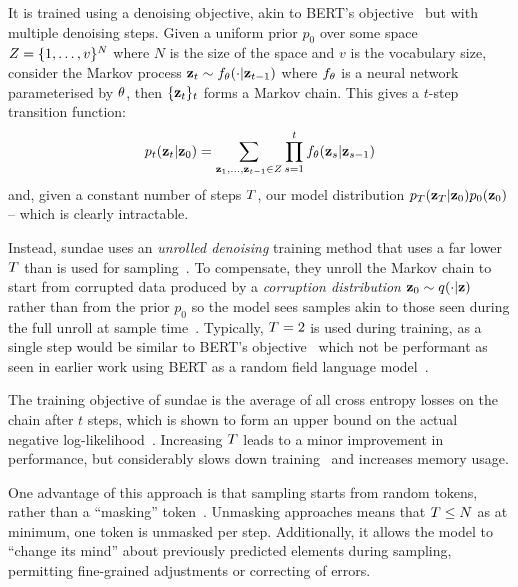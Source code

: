 It is trained using a denoising objective, akin to 
BERT's objective~\cite{wang2019bert} but with multiple denoising steps.
Given a uniform prior $p_0$ over some space $Z = \{1, \dots,
v\}^N$ where $N$ is the size of the space and $v$ is the
vocabulary size, consider the Markov process $\mathbf{z}_t \sim f_\theta(\cdot \vert
\mathbf{z}_{t-1})$ where $f_\theta$ is a neural network parameterised by
$\theta$, then $\{\mathbf{z}_t\}_t$ forms a Markov chain. This gives a
$t$-step transition function: 
\begin{equation}\label{eq:markov} p_t(\mathbf{z}_t
    \vert \mathbf{z}_0) = \sum\limits_{\mathbf{z}_1, \dots, \mathbf{z}_{t-1} \in
    Z} \prod\limits^t_{s=1} f_\theta(\mathbf{z}_s | \mathbf{z}_{s-1})
\end{equation}
\cite{savinov2022stepunrolled} and, given a constant number of steps
$T$, our model distribution $p_T(\mathbf{z}_T
\vert \mathbf{z}_0)p_0(\mathbf{z}_0)$ -- which is clearly intractable.

Instead, \gls{sundae} uses an \textit{unrolled denoising} training method that
uses a far lower $T$ than is used for
sampling~\cite{savinov2022stepunrolled}. To compensate, they unroll the Markov
chain to start from corrupted data produced by a \textit{corruption
distribution} $\mathbf{z}_0 \sim q(\cdot \vert \mathbf{z})$
rather than from the prior $p_0$ so the model sees samples akin to those seen
during the full unroll at sample time~\cite{savinov2022stepunrolled}. Typically,
$T = 2$ is used during training, as a single step would be similar to
BERT's objective~\cite{devlin2019bert} which not be performant as seen in
earlier work using BERT as a random field language model~\cite{wang2019bert}.

The training objective of \gls{sundae} is the average of all
cross entropy losses on the chain after $t$ steps, which is shown to form an
upper bound on the actual negative
log-likelihood~\cite{savinov2022stepunrolled}. Increasing $T$
leads to a minor improvement in performance, but considerably slows down
training~\cite{savinov2022stepunrolled} and increases memory usage.

One advantage of this approach is that sampling starts from random tokens,
rather than a ``masking''
token~\cite{bondtaylor2021unleashing,austin2021structured}. Unmasking approaches
means that $T \leq N$ as at minimum, one token is unmasked per step.
Additionally, it allows the model to ``change its mind'' about previously
predicted elements during sampling, permitting fine-grained adjustments or
correcting of errors.

